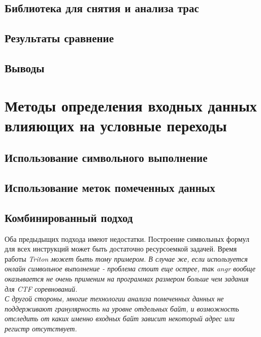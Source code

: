 \begin{itemize}
\subsection{Библиотека для снятия и анализа трас}

\subsection{Результаты сравнение}

\subsection{Выводы}




\section{Методы определения входных данных влияющих на условные переходы}


\subsection{Использование символьного выполнение}



\subsection{Использование меток помеченных данных}

\subsection{Комбинированный подход}

Оба предыдыщих подхода имеют недостатки. Построение символьных формул для всех инструкций может быть достаточно ресурсоемкой задачей. Время работы \em{Triton} может быть тому примером. В случае же, если используется онлайн символьное выполнение - проблема стоит еще острее, так \em{angr} вообще оказывается не очень применим на программах размером больше чем задания для CTF соревнований.
\\
С другой стороны, многие технологии анализа помеченных данных не поддерживают гранулярность на уровне отдельных байт, и возможность отследить от каких именно входных байт зависит некоторый адрес или регистр отсутствует. %


\end{itemize}
